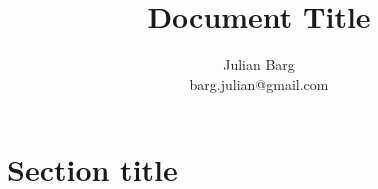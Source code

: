 \documentclass[12pt, man, natbib]{apa6}
\title{Document Title}
\author{Julian Barg\\barg.julian@gmail.com}
\affiliation{Ivey Business School}
\begin{document}
	
	\maketitle
	
	\singlespacing
	
	\section{Section title}	
\end{document}
